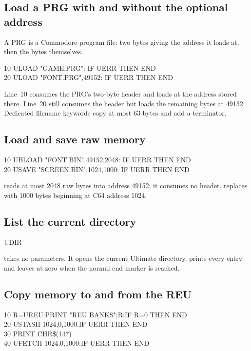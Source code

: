 \subsection*{Load a PRG with and without the optional address}

A PRG is a Commodore program file: two bytes giving the address it loads at,
then the bytes themselves.

\begin{screen}
10 ULOAD "GAME.PRG": IF UERR THEN END\\
20 ULOAD "FONT.PRG",49152: IF UERR THEN END
\end{screen}

Line~10 consumes the PRG's two-byte header and loads at the address stored
there. Line~20 still consumes the header but loads the remaining bytes at
49152. Dedicated filename keywords copy at most 63 bytes and add a terminator.

\subsection*{Load and save raw memory}

\begin{screen}
10 UBLOAD "FONT.BIN",49152,2048: IF UERR THEN END\\
20 USAVE "SCREEN.BIN",1024,1000: IF UERR THEN END
\end{screen}

 reads at most 2048 raw bytes into address 49152; it consumes no
header.  replaces  with 1000 bytes beginning at C64
address 1024.

\subsection*{List the current directory}

\begin{screen}
UDIR
\end{screen}

 takes no parameters. It opens the current Ultimate directory,
prints every entry and leaves  at zero when the normal end marker is
reached.

\subsection*{Copy memory to and from the REU}

\begin{screen}
10 R=UREU:PRINT "REU BANKS";R:IF R=0 THEN END\\
20 USTASH 1024,0,1000:IF UERR THEN END\\
30 PRINT CHR\$(147)\\
40 UFETCH 1024,0,1000:IF UERR THEN END
\end{screen}


